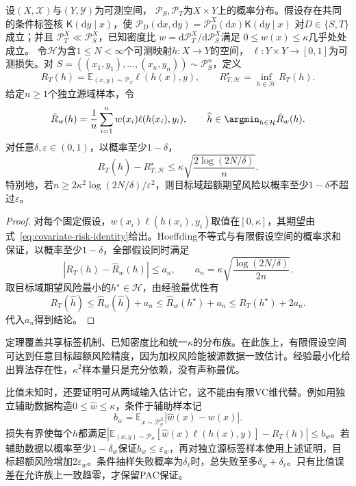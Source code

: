 \begin{theorem}[已知密度比下的迁移样本量界]
\label{thm:covariate-finite-pac}
设$(X,\mathcal X)$与$(Y,\mathcal Y)$为可测空间，
$\mathcal P_S,\mathcal P_T$为$X\times Y$上的概率分布。假设存在共同的条件标签核
$\mathsf K(\mathrm dy\mid x)$，使
$\mathcal P_D(\mathrm dx,\mathrm dy)
=\mathcal P_D^X(\mathrm dx)\mathsf K(\mathrm dy\mid x)$
对$D\in\{S,T\}$成立；并且
$\mathcal P_T^X\ll\mathcal P_S^X$，已知密度比
$w=\mathrm d\mathcal P_T^X/\mathrm d\mathcal P_S^X$满足
$0\leq w(x)\leq\kappa$几乎处处成立。
令$\mathcal H$为含$1\leq N<\infty$个可测映射$h:X\to Y$的空间，
$\ell:Y\times Y\to[0,1]$为可测损失。对
$S=((x_1,y_1),\ldots,(x_n,y_n))\sim\mathcal P_S^n$，定义
\[
 R_T(h)=\mathbb E_{(x,y)\sim\mathcal P_T}\ell(h(x),y),\qquad
 R_{T,\mathcal H}^{\star}=\inf_{h\in\mathcal H}R_T(h).
\]
给定$n\geq1$个独立源域样本，令
\[
 \hat R_w(h)=\frac1n\sum_{i=1}^n
          w(x_i)\ell(h(x_i),y_i),\qquad
 \widehat h\in\argmin_{h\in\mathcal H}\hat R_w(h).
\]
对任意$\delta,\varepsilon\in(0,1)$，以概率至少$1-\delta$，
\begin{equation}
 R_T(\widehat h)-R_{T,\mathcal H}^{\star}
 \leq\kappa\sqrt{\frac{2\log(2N/\delta)}{n}}.
 \label{eq:covariate-finite-excess}
\end{equation}
特别地，若$n\geq2\kappa^2\log(2N/\delta)/\varepsilon^2$，则目标域超额期望风险以概率至少$1-\delta$不超过$\varepsilon$。
\end{theorem}
\begin{proof}
对每个固定假设，$w(x_i)\ell(h(x_i),y_i)$取值在$[0,\kappa]$，其期望由式~\eqref{eq:covariate-risk-identity}给出。Hoeffding不等式与有限假设空间的概率求和保证，以概率至少$1-\delta$，全部假设同时满足
\[
 |R_T(h)-\hat R_w(h)|\leq
 a_n,\qquad a_n=\kappa\sqrt{\frac{\log(2N/\delta)}{2n}}.
\]
取目标域期望风险最小的$h^\star\in\mathcal H$，由经验最优性有
\[
 R_T(\widehat h)
 \leq\hat R_w(\widehat h)+a_n
 \leq\hat R_w(h^\star)+a_n
 \leq R_T(h^\star)+2a_n.
\]
代入$a_n$得到结论。
\end{proof}

定理覆盖共享标签机制、已知密度比和统一$\kappa$的分布族。在此族上，有限假设空间可达到任意目标超额风险精度，因为加权风险能被源数据一致估计。经验最小化给出算法存在性，$\kappa^2$样本量只是充分依赖，没有声称最优。

比值未知时，还要证明可从两域输入估计它，这不能由有限VC维代替。例如用独立辅助数据构造$0\leq\widehat w\leq\kappa$，条件于辅助样本记
\[
 b_w=\mathbb E_{x\sim\mathcal P_S^X}|\widehat w(x)-w(x)|.
\]
损失有界使每个$h$都满足$|\mathbb E_{(x,y)\sim\mathcal P_S}[\widehat w(x)\ell(h(x),y)]-R_T(h)|\leq b_w$。若辅助数据以概率至少$1-\delta_w$保证$b_w\leq\varepsilon_w$，再对独立源标签样本使用上述证明，目标超额风险增加$2\varepsilon_w$。条件抽样失败概率为$\delta_\ell$时，总失败至多$\delta_w+\delta_\ell$。只有比值误差在允许族上一致趋零，才保留PAC保证。

